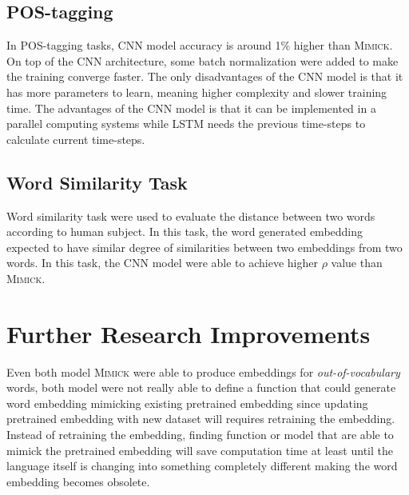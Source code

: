 \subsection{POS-tagging}
In POS-tagging tasks, CNN model accuracy is around 1\% higher than
\textsc{Mimick}. On top of the CNN architecture, some batch
normalization were added to make the training converge faster. The
only disadvantages of the CNN model is that it has more parameters
to learn, meaning higher complexity and slower training time. The
advantages of the CNN model is that it can be implemented in a
parallel computing systems while LSTM needs the previous time-steps to
calculate current time-steps.

\subsection{Word Similarity Task}
Word similarity task were used to evaluate the distance between two
words according to human subject. In this task, the word generated
embedding expected to have similar degree of similarities between two
embeddings from two words. In this task, the CNN model were able to
achieve higher $\rho$ value than \textsc{Mimick}.

\section{Further Research Improvements}
Even both model \textsc{Mimick} were able to produce embeddings for
\textit{out-of-vocabulary} words, both model were not really able to
define a function that could generate word embedding mimicking
existing pretrained embedding since updating pretrained embedding with
new dataset will requires retraining the embedding. Instead of
retraining the embedding, finding function or model that are able to
mimick the pretrained embedding will save computation time at least
until the language itself is changing into something completely
different making the word embedding becomes obsolete.